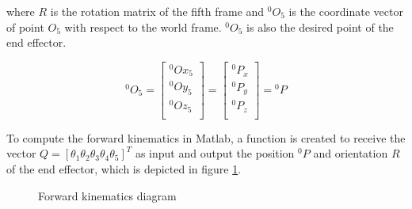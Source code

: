 \documentclass{article}
\begin{document}
where $R$ is the rotation matrix of the fifth frame and ${}^0O_5$ is the coordinate vector of point $O_5$ with respect to the world frame. ${}^0O_5$  is also the desired point of the end effector.

\begin{equation*}
{}^0O_5 = \left[
\begin{array}{c}
	{}^0Ox_5 \\
	{}^0Oy_5 \\
	{}^0Oz_5 \\
\end{array}
\right] = \left[
\begin{array}{c}
	{}^0P_x \\
	{}^0P_y \\
	{}^0P_z \\
\end{array}
\right] = {}^0P
\end{equation*}

To compute the forward kinematics in Matlab, a function is created to receive the vector $Q=[\theta_1 \theta_2 \theta_3 \theta_4 \theta_5]^T$ as input and output the position ${}^0P$ and orientation $R$ of the end effector, which is depicted in figure \ref{fig:forward.block_diagram}.

\begin{figure}
\begin{center}
\caption{Forward kinematics diagram}
\label{fig:forward.block_diagram}
\end{center}
\end{figure}
\end{document}
